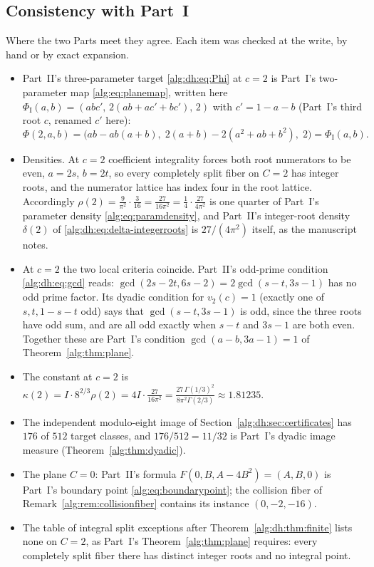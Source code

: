 \documentclass[11pt]{article}
\numberwithin{equation}{section}
\theoremstyle{plain}
\theoremstyle{plain}
\theoremstyle{plain}
\theoremstyle{definition}
\theoremstyle{definition}
\theoremstyle{definition}
\theoremstyle{remark}
\begin{document}
\subsection{Consistency with Part~I}\label{alg:dh:sec:consistency}
Where the two Parts meet they agree. Each item was checked at the write,
by hand or by exact expansion.
\begin{itemize}[itemsep=2pt,topsep=3pt]
\item Part~II's three-parameter target \eqref{alg:dh:eq:Phi} at $c=2$ is
Part~I's two-parameter map \eqref{alg:eq:planemap}, written here
$\Phi_{\mathrm I}(a,b)=(abc',\,2(ab+ac'+bc'),\,2)$ with $c'=1-a-b$
(Part~I's third root $c$, renamed $c'$ here):
\[
 \Phi(2,a,b)=\bigl(ab-ab(a+b),\;2(a+b)-2(a^2+ab+b^2),\;2\bigr)
 =\Phi_{\mathrm I}(a,b).
\]
\item Densities. At $c=2$ coefficient integrality forces both root
numerators to be even, $a=2s$, $b=2t$, so every completely split fiber on
$C=2$ has integer roots, and the numerator lattice has index four in the
root lattice. Accordingly
$\rho(2)=\tfrac{9}{\pi^2}\cdot\tfrac{3}{16}=\tfrac{27}{16\pi^2}
=\tfrac14\cdot\tfrac{27}{4\pi^2}$ is one quarter of Part~I's parameter
density \eqref{alg:eq:paramdensity}, and Part~II's integer-root density
$\delta(2)$ of \eqref{alg:dh:eq:delta-integerroots} is $27/(4\pi^2)$
itself, as the manuscript notes.
\item At $c=2$ the two local criteria coincide. Part~II's odd-prime
condition \eqref{alg:dh:eq:gcd} reads: $\gcd(2s-2t,6s-2)=2\gcd(s-t,3s-1)$
has no odd prime factor. Its dyadic condition for $v_2(c)=1$ (exactly one
of $s,t,1-s-t$ odd) says that $\gcd(s-t,3s-1)$ is odd, since the three
roots have odd sum, and are all odd exactly when $s-t$ and $3s-1$ are
both even. Together these are Part~I's condition $\gcd(a-b,3a-1)=1$ of
Theorem~\ref{alg:thm:plane}.
\item The constant at $c=2$ is
$\kappa(2)=I\cdot8^{2/3}\rho(2)=4I\cdot\tfrac{27}{16\pi^2}
=\tfrac{27\,\Gamma(1/3)^2}{8\pi^2\Gamma(2/3)}\approx1.81235$.
\item The independent modulo-eight image of
Section~\ref{alg:dh:sec:certificates} has $176$ of $512$ target classes,
and $176/512=11/32$ is Part~I's dyadic image measure
(Theorem~\ref{alg:thm:dyadic}).
\item The plane $C=0$: Part~II's formula $F(0,B,A-4B^2)=(A,B,0)$ is
Part~I's boundary point \eqref{alg:eq:boundarypoint}; the collision fiber
of Remark~\ref{alg:rem:collisionfiber} contains its instance
$(0,-2,-16)$.
\item The table of integral split exceptions after
Theorem~\ref{alg:dh:thm:finite} lists none on $C=2$, as Part~I's
Theorem~\ref{alg:thm:plane} requires: every completely split fiber there
has distinct integer roots and no integral point.
\end{itemize}
\end{document}
